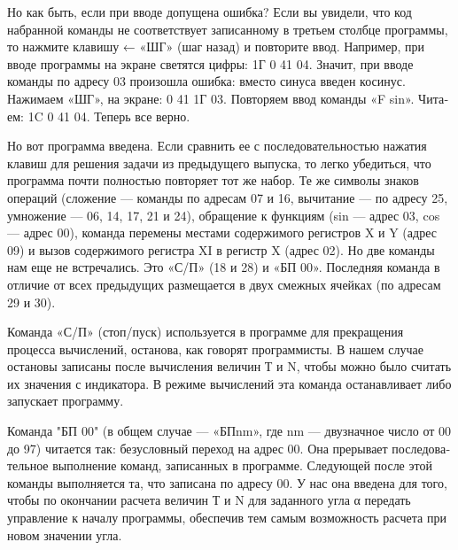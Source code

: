 \documentclass[11pt,a4paper,oneside]{article}
\begin{document}
Но как быть, если при вводе допу­щена ошибка? Если вы увидели, что код набранной команды не соответ­ствует записанному в третьем столб­це программы, то нажмите клавишу ← «ШГ» (шаг назад) и повторите ввод. Например, при вводе программы на экране светятся цифры: 1Г 0 41 04. Значит, при вводе команды по адре­су 03 произошла ошибка: вместо си­нуса введен косинус. Нажимаем «ШГ», на экране: 0 41 1Г 03. По­вторяем ввод команды «F sin». Чита­ем: 1C 0 41 04. Теперь все верно.

Но вот программа введена. Если сравнить ее с последовательностью нажатия клавиш для решения зада­чи из предыдущего выпуска, то легко убедиться, что программа поч­ти полностью повторяет тот же на­бор. Те же символы знаков опера­ций (сложение — команды по адре­сам 07 и 16, вычитание — по адре­су 25, умножение — 06, 14, 17, 21 и 24), обращение к функциям (sin — адрес 03, cos — адрес 00), коман­да перемены местами содержимого регистров X и Y (адрес 09) и вы­зов содержимого регистра XI в ре­гистр X (адрес 02). Но две коман­ды нам еще не встречались. Это «С/П» (18 и 28) и «БП 00». По­следняя команда в отличие от всех предыдущих размещается в двух смежных ячейках (по адресам 29 и 30).

Команда «С/П» (стоп/пуск) исполь­зуется в программе для прекраще­ния процесса вычислений, останова, как говорят программисты. В нашем случае остановы записаны после вы­числения величин Т и N, чтобы мож­но было считать их значения с индикатора. В режиме вычислений эта команда останавливает либо запус­кает программу.

Команда "БП 00" (в общем слу­чае — «БПnm», где nm — дву­значное число от 00 до 97) читает­ся так: безусловный переход на ад­рес 00. Она прерывает последова­тельное выполнение команд, записан­ных в программе. Следующей после этой команды выполняется та, что записана по адресу 00. У нас она введена для того, чтобы по оконча­нии расчета величин Т и N для за­данного угла α передать управление к началу программы, обеспечив тем самым возможность расчета при но­вом значении угла.
\end{document}
